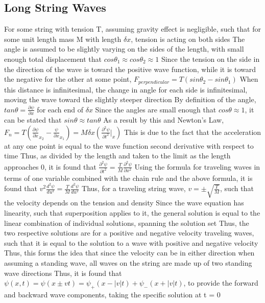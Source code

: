 \documentclass[11 pt, twoside]{article}
\newenvironment{outline*}
{
	\begin{outline}[enumerate]
	}
	{\end{outline}
}
\begin{document}
\subsection{Long String Waves}
\begin{outline*}
\1 For some string with tension T, assuming gravity effect is negligible, such that for some unit length mass M with length $\delta x$, tension is acting on both sides
\2 The angle is assumed to be slightly varying on the sides of the length, with small enough total displacement that $cos\theta_1 \approx cos\theta_2 \approx 1$
\3 Since the tension on the side in the direction of the wave is toward the positive wave function, while it is toward the negative for the other at some point, $F_{perpendicular} = T(sin\theta_2 - sin\theta_1)$
\3 When this distance is infinitesimal, the change in angle for each side is infinitesimal, moving the wave toward the slightly steeper direction
\2 By definition of the angle, $tan\theta = \frac{\partial \psi}{\partial x}$ for each end of $\delta x$
\3 Since the angles are small enough that $cos\theta \approx 1$, it can be stated that $sin\theta \approx tan\theta$
\3 As a result by this and Newton's Law, $F_n = T(\frac{\partial \psi}{\partial x}_{x_2} - \frac{\psi}{\partial x}_{x_1}) = M\delta x (\frac{\partial^2 \psi}{\partial t^2}|_x)$
\4 This is due to the fact that the acceleration at any one point is equal to the wave function second derivative with respect to time
\3 Thus, as divided by the length and taken to the limit as the length approaches 0, it is found that $\frac{\partial^2 \psi}{\partial t^2} = \frac{T}{M}\frac{\partial^2 \psi}{\partial x^2}$
\1 Using the formula for traveling waves in terms of one variable combined with the chain rule and the above formula, it is found that $v^2 \frac{d^2 \psi}{du^2} = \frac{T}{M} \frac{d^2 \psi}{du^2}$
\2 Thus, for a traveling string wave, $v = \pm \sqrt{\frac{T}{M}}$, such that the velocity depends on the tension and density
\1 Since the wave equation has linearity, such that superposition applies to it, the general solution is equal to the linear combination of individual solutions, spanning the solution set
\2 Thus, the two respective solutions are for a positive and negative velocity traveling waves, such that it is equal to the solution to a wave with positive and negative velocity
\3 Thus, this forms the idea that since the velocity can be in either direction when assuming a standing wave, all waves on the string are made up of two standing wave directions
\2 Thus, it is found that $\psi(x, t) = \psi(x \pm vt) = \psi_+(x - |v|t) + \psi_-(x + |v|t)$, to provide the forward and backward wave components, taking the specific solution at t = 0

\end{outline*}
\end{document}
